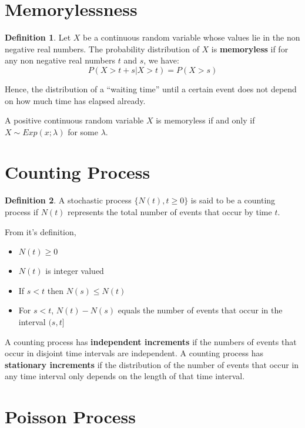 \documentclass[12pt,letterpaper]{book}
\theoremstyle{definition}
\newtheorem{definition}{Definition}%
\begin{document}
\section{Memorylessness}

\begin{definition}
Let $X$ be a continuous random variable whose values lie in the non negative real numbers. The probability distribution of $X$ is \textbf{memoryless} if for any non negative real numbers $t$ and $s$, we have:
\[P(X>t + s | X > t) = P(X>s)\]
\end{definition}

Hence, the distribution of a ``waiting time'' until a certain event does not depend on how much time has elapsed already.

\begin{theorem}
  A positive continuous random variable $X$ is memoryless if and only if $X \sim Exp(x;\lambda)$ for some $\lambda$.
\end{theorem}

\section{Counting Process}

\begin{definition}
A stochastic process $\{N(t),t \geq 0\}$ is said to be a counting process if $N(t)$ represents the total number of events that occur by time $t$.  
\end{definition}

From it's definition, 
\begin{itemize}
  \item $N(t) \geq 0$
  \item $N(t)$ is integer valued
  \item If $s < t$ then $N(s) \leq N(t)$
  \item For $s < t$, $N(t)-N(s)$ equals the number of events that occur in the interval $(s,t]$
\end{itemize}

A counting process has \textbf{independent increments}  if the numbers of events that occur in disjoint time intervals are independent. A counting process has \textbf{stationary increments} if the distribution of the number of events that occur in any time interval only depends on the length of that time interval.

\section{Poisson Process}
\end{document}
